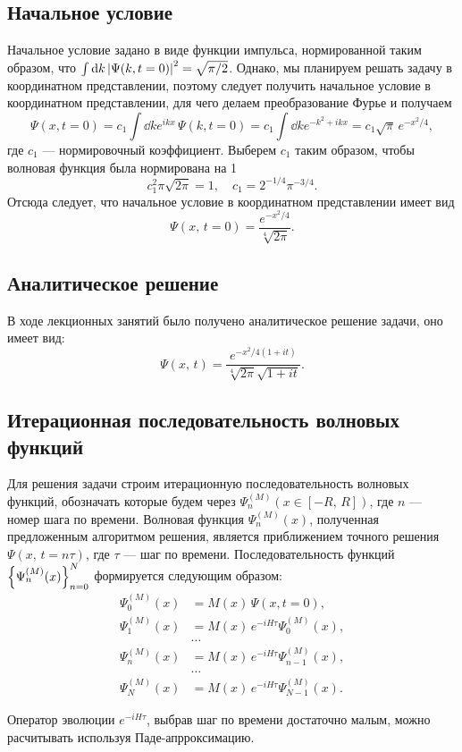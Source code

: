 \documentclass[10pt]{article}
\begin{document}
\subsection*{Начальное условие}
Начальное условие задано в виде функции импульса, нормированной таким образом, что $\int \dd{k} \abs{\Psi(k,t=0)}^2 = \sqrt{\pi/2}$. Однако, мы планируем решать задачу в координатном представлении, поэтому следует получить начальное условие в координатном представлении, для чего делаем преобразование Фурье и получаем
\begin{equation}
	\Psi(x,t=0) = c_1 \int \dd{k} e^{ikx}\, \Psi(k,t=0) = c_1 \int \dd{k} e^{-k^2+ikx} = c_1 \sqrt{\pi}\, e^{-x^2/4},
\end{equation}
где $c_1$ --- нормировочный коэффициент. Выберем $c_1$ таким образом, чтобы волновая функция была нормирована на 1
\begin{equation}
	c_1^2 \pi \sqrt{2\pi} = 1,\quad c_1 = 2^{-1/4} \pi^{-3/4}.
\end{equation}
Отсюда следует, что начальное условие в координатном представлении имеет вид
\begin{equation}
	\Psi(x,\,t=0) = \dfrac{e^{-x^2/4}}{\sqrt[4]{2\pi}}.
\end{equation}

\subsection*{Аналитическое решение}
В ходе лекционных занятий было получено аналитическое решение задачи, оно имеет вид:
\begin{equation}
	\Psi(x,\,t) = \dfrac{e^{-x^2/4(1+it)}}{\sqrt[4]{2\pi}\sqrt{1+it}}.
\end{equation}

\subsection*{Итерационная последовательность волновых функций}
Для решения задачи строим итерационную последовательность волновых функций, обозначать которые будем через $\Psi^{(M)}_n(x\in[-R,\,R])$, где $n$ --- номер шага по времени. Волновая функция $\Psi^{(M)}_n(x)$, полученная предложенным алгоритмом решения, является приближением точного решения $\Psi(x,\, t=n\tau)$, где $\tau$ --- шаг по времени. Последовательность функций $\qty{\Psi^{(M)}_n(x)}_{n=0}^{N}$ формируется следующим образом:
\begin{equation}
	\begin{split}
		\Psi^{(M)}_0(x) &= M(x)\, \Psi(x,t=0),\\
		\Psi^{(M)}_1(x) &= M(x)\, e^{-i H \tau} \Psi^{(M)}_0(x),\\
		&\ldots\\
		\Psi^{(M)}_n(x) &= M(x)\, e^{-i H \tau} \Psi^{(M)}_{n-1}(x),\\
		&\ldots\\
		\Psi^{(M)}_N(x) &= M(x)\, e^{-i H \tau} \Psi^{(M)}_{N-1}(x).
	\end{split}
\end{equation}

Оператор эволюции $e^{-i H \tau}$, выбрав шаг по времени достаточно малым, можно расчитывать используя Паде-апрроксимацию.
\end{document}
